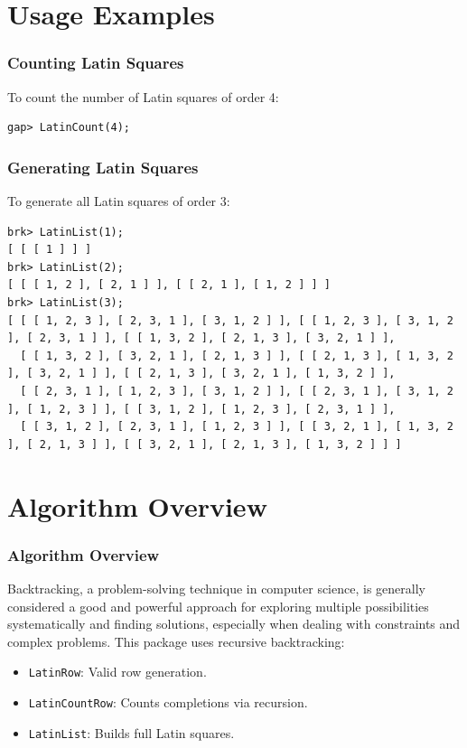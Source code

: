 \documentclass{beamer}
\begin{document}
\section{Usage Examples}
\begin{frame}[fragile]
\frametitle{Counting Latin Squares}
To count the number of Latin squares of order 4:
\begin{lstlisting}
gap> LatinCount(4);
\end{lstlisting}
\end{frame}

\begin{frame}[fragile]
\frametitle{Generating Latin Squares}
To generate all Latin squares of order 3:
\begin{lstlisting}
brk> LatinList(1);
[ [ [ 1 ] ] ]
brk> LatinList(2);
[ [ [ 1, 2 ], [ 2, 1 ] ], [ [ 2, 1 ], [ 1, 2 ] ] ]
brk> LatinList(3);
[ [ [ 1, 2, 3 ], [ 2, 3, 1 ], [ 3, 1, 2 ] ], [ [ 1, 2, 3 ], [ 3, 1, 2 ], [ 2, 3, 1 ] ], [ [ 1, 3, 2 ], [ 2, 1, 3 ], [ 3, 2, 1 ] ],
  [ [ 1, 3, 2 ], [ 3, 2, 1 ], [ 2, 1, 3 ] ], [ [ 2, 1, 3 ], [ 1, 3, 2 ], [ 3, 2, 1 ] ], [ [ 2, 1, 3 ], [ 3, 2, 1 ], [ 1, 3, 2 ] ],
  [ [ 2, 3, 1 ], [ 1, 2, 3 ], [ 3, 1, 2 ] ], [ [ 2, 3, 1 ], [ 3, 1, 2 ], [ 1, 2, 3 ] ], [ [ 3, 1, 2 ], [ 1, 2, 3 ], [ 2, 3, 1 ] ],
  [ [ 3, 1, 2 ], [ 2, 3, 1 ], [ 1, 2, 3 ] ], [ [ 3, 2, 1 ], [ 1, 3, 2 ], [ 2, 1, 3 ] ], [ [ 3, 2, 1 ], [ 2, 1, 3 ], [ 1, 3, 2 ] ] ]
\end{lstlisting}
\end{frame}

\section{Algorithm Overview}
\begin{frame}
\frametitle{Algorithm Overview}
Backtracking, a problem-solving technique in computer science, is generally considered a good and powerful approach for exploring multiple possibilities systematically and finding solutions, especially when dealing with constraints and complex problems. 
This package uses recursive backtracking:
\begin{itemize}
  \item \texttt{LatinRow}: Valid row generation.
  \item \texttt{LatinCountRow}: Counts completions via recursion.
  \item \texttt{LatinList}: Builds full Latin squares.
\end{itemize}
\end{frame}
\end{document}
